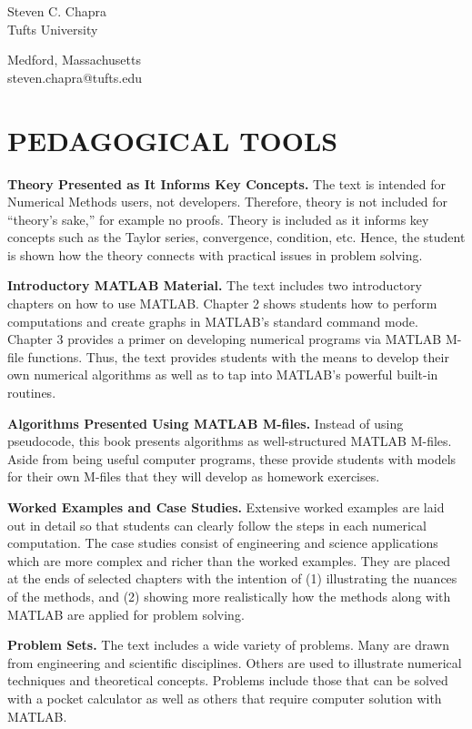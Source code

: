 \documentclass[../main.tex]{subfiles}
\begin{document}
\begin{flushright}
Steven C. Chapra\\
Tufts University



Medford, Massachusetts\\
steven.chapra@tufts.edu\\
\end{flushright}


\bigskip
\section*{PEDAGOGICAL TOOLS}
\label{sec:sec_P_1_1}


\textbf{Theory Presented as It Informs Key Concepts.} The text is intended for Numerical Methods users, not developers. Therefore, theory is not included for “theory’s sake,” for example no
proofs. Theory is included as it informs key concepts such as the Taylor series, convergence,
condition, etc. Hence, the student is shown how the theory connects with practical issues in
problem solving.


\textbf{Introductory MATLAB Material.} The text includes two introductory chapters on how to
use MATLAB. Chapter 2 shows students how to perform computations and create graphs
in MATLAB’s standard command mode. Chapter 3 provides a primer on developing
numerical programs via MATLAB M-file functions. Thus, the text provides students with
the means to develop their own numerical algorithms as well as to tap into MATLAB’s
powerful built-in routines.

\textbf{Algorithms Presented Using MATLAB M-files.} Instead of using pseudocode, this book
presents algorithms as well-structured MATLAB M-files. Aside from being useful computer programs, these provide students with models for their own M-files that they will
develop as homework exercises.

\textbf{Worked Examples and Case Studies.} Extensive worked examples are laid out in detail
so that students can clearly follow the steps in each numerical computation. The case studies consist of engineering and science applications which are more complex and richer than
the worked examples. They are placed at the ends of selected chapters with the intention of
(1) illustrating the nuances of the methods, and (2) showing more realistically how the
methods along with MATLAB are applied for problem solving.

\textbf{Problem Sets.} The text includes a wide variety of problems. Many are drawn from engineering and scientific disciplines. Others are used to illustrate numerical techniques and
theoretical concepts. Problems include those that can be solved with a pocket calculator as
well as others that require computer solution with MATLAB.
\end{document}
